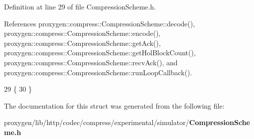 Definition at line 29 of file Compression\+Scheme.\+h.



References proxygen\+::compress\+::\+Compression\+Scheme\+::decode(), proxygen\+::compress\+::\+Compression\+Scheme\+::encode(), proxygen\+::compress\+::\+Compression\+Scheme\+::get\+Ack(), proxygen\+::compress\+::\+Compression\+Scheme\+::get\+Hol\+Block\+Count(), proxygen\+::compress\+::\+Compression\+Scheme\+::recv\+Ack(), and proxygen\+::compress\+::\+Compression\+Scheme\+::run\+Loop\+Callback().


\begin{DoxyCode}
29                    \{
30     \}
\end{DoxyCode}


The documentation for this struct was generated from the following file\+:\begin{DoxyCompactItemize}
\item 
proxygen/lib/http/codec/compress/experimental/simulator/{\bf Compression\+Scheme.\+h}\end{DoxyCompactItemize}
